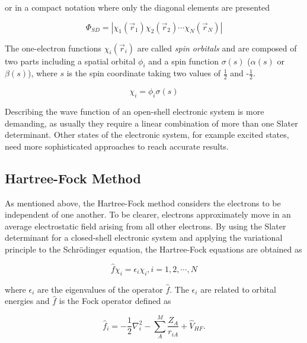 \begin{refsection}
\noindent or in a compact notation where only the diagonal elements are presented

\begin{equation}
\Phi_{SD} = \left|\chi_1(\vec{r}_1)\chi_2(\vec{r}_2)\cdots\chi_N(\vec{r}_N)\right|
\label{eq:SlaterWave_short}
\end{equation}

\noindent The one-electron functions $\chi_i(\vec{r}_i)$ are called \textit{spin orbitals} and are composed of two parts including a spatial orbital $\phi_{i}$ and a spin function $\sigma(s)$ ($\alpha(s)$ or $\beta(s)$), where $s$ is the spin coordinate taking two values of $\frac{1}{2}$ and -$\frac{1}{2}$.

\begin{equation}
\chi_{i} = \phi_{i}\sigma(s)
\label{eq:SpinOrbital}
\end{equation}

\noindent Describing the wave function of an open-shell electronic system is more demanding, as usually they require a linear combination of more than one Slater determinant. Other states of the electronic system, for example excited states, need more sophisticated approaches to reach accurate results.

\subsection{Hartree-Fock Method}

As mentioned above, the Hartree-Fock method considers the electrons to be independent of one another. To be clearer, electrons approximately move in an average electrostatic field arising from all other electrons.  By using  the Slater determinant for a closed-shell electronic system and applying the variational principle to the Schr\"odinger equation, the Hartree-Fock equations are obtained as

\begin{equation}
\widehat{f}\chi_i = \epsilon_i\chi_i, i = 1,2,\cdots, N
\label{eq:Hartree-Fock}
\end{equation}

\noindent where $\epsilon_i$ are the eigenvalues of the operator $\widehat{f}$. The $\epsilon_i$ are related to orbital energies and $\widehat{f}$ is the Fock operator defined as

\begin{equation}
\widehat{f}_i = -\frac{1}{2}\nabla_i^2 - \sum_{A}^{M}\frac{Z_A}{r_{iA}} + \widehat{V}_{HF}.
\label{eq:HF_operator}
\end{equation}




\end{refsection}
